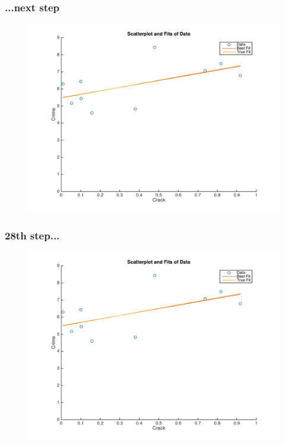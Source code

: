 \documentclass{beamer}
\begin{document}
\begin{frame}
\frametitle[alignment=center]{...next step}
\begin{figure}
\centering
\includegraphics[scale=0.5]{Newton_OLS_Figure_28.png}
\end{figure}
\end{frame}

\begin{frame}
\frametitle[alignment=center]{28th step...}
\begin{figure}
\centering
\includegraphics[scale=0.5]{Newton_OLS_Figure_29.png}
\end{figure}
\end{frame}
\end{document}
